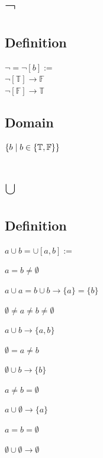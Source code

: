 \documentclass[11pt]{article}
\begin{document}
\newpage
\section{$\lnot$}
\subsection{Definition}
\begin{center}
$
\lnot = \lnot[b] :=
$
\\ \vspace{2mm}
$
 \lnot[\mathbb{T}] \rightarrow \mathbb{F}
 $
 \\ \vspace{2mm}
 $
 \lnot[\mathbb{F}] \rightarrow \mathbb{T}
$
\end{center}
\subsection{Domain}
\begin{center}
$
\{ b \hspace{1mm}| \hspace{1mm} b \in \{\mathbb{T}, \mathbb{F}\}\}
$
\end{center}
















\newpage
\section{$\cup$}
\subsection{Definition}
\vspace{1mm}
\begin{center}
$
a  \cup  b = \cup[a,b] := 
$
\end{center}
$a = b \neq \emptyset$
\begin{center}
$
a  \cup  a = b \cup b \rightarrow \{a\} = \{b\}
$
\end{center}
\vspace{2mm}
$\emptyset \neq a \neq b \neq \emptyset$
\begin{center}
$
a \cup  b \rightarrow \{a,b\}
$
\end{center}
\vspace{2mm}
$\emptyset = a \neq b$
\begin{center}
$
\emptyset \cup  b \rightarrow \{b\}
$
\end{center}
\vspace{2mm}
$a \neq b = \emptyset$
\begin{center}
$
a \cup \emptyset \rightarrow \{a\}
$
\end{center}
\vspace{2mm}
$a = b = \emptyset$
\begin{center}
$
\emptyset \cup \emptyset \rightarrow \emptyset
$
\end{center}
\end{document}
